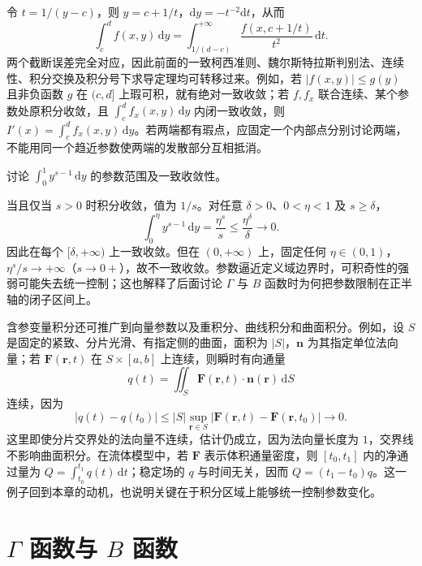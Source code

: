令 $t=1/(y-c)$，则 $y=c+1/t$，$\mathrm{d}y=-t^{-2}\mathrm{d}t$，从而
\begin{equation}
    \int_c^d f(x,y)\,\mathrm{d}y
    =\int_{1/(d-c)}^{+\infty}
        \frac{f(x,c+1/t)}{t^2}\,\mathrm{d}t.
    \label{eq:parameter-singular-to-infinite}
\end{equation}
两个截断误差完全对应，因此前面的一致柯西准则、魏尔斯特拉斯判别法、连续性、积分交换及积分号下求导定理均可转移过来。例如，若 $|f(x,y)|\leq g(y)$ 且非负函数 $g$ 在 $(c,d]$ 上瑕可积，就有绝对一致收敛；若 $f,f_x$ 联合连续、某个参数处原积分收敛，且 $\int_c^d f_x(x,y)\,\mathrm{d}y$ 内闭一致收敛，则 $I'(x)=\int_c^d f_x(x,y)\,\mathrm{d}y$。若两端都有瑕点，应固定一个内部点分别讨论两端，不能用同一个趋近参数使两端的发散部分互相抵消。

\begin{example}
\label{ex:parameter-power-singularity-uniformity}
讨论 $\displaystyle\int_0^1y^{s-1}\,\mathrm{d}y$ 的参数范围及一致收敛性。
\end{example}

\begin{solve}
当且仅当 $s>0$ 时积分收敛，值为 $1/s$。对任意 $\delta>0$、$0<\eta<1$ 及 $s\geq\delta$，
\[
    \int_0^\eta y^{s-1}\,\mathrm{d}y
    =\frac{\eta^s}{s}\leq\frac{\eta^\delta}{\delta}\longrightarrow0.
\]
因此在每个 $[\delta,+\infty)$ 上一致收敛。但在 $(0,+\infty)$ 上，固定任何 $\eta\in(0,1)$，$\eta^s/s\to+\infty$（$s\to0+$），故不一致收敛。参数逼近定义域边界时，可积奇性的强弱可能失去统一控制；这也解释了后面讨论 $\Gamma$ 与 $B$ 函数时为何把参数限制在正半轴的闭子区间上。
\end{solve}

含参变量积分还可推广到向量参数以及重积分、曲线积分和曲面积分。例如，设 $S$ 是固定的紧致、分片光滑、有指定侧的曲面，面积为 $|S|$，$\boldsymbol n$ 为其指定单位法向量；若 $\boldsymbol F(\boldsymbol r,t)$ 在 $S\times[a,b]$ 上连续，则瞬时有向通量
\[
    q(t)=\iint_S\boldsymbol F(\boldsymbol r,t)\cdot\boldsymbol n(\boldsymbol r)\,\mathrm{d}S
\]
连续，因为
\[
    |q(t)-q(t_0)|\leq |S|\sup_{\boldsymbol r\in S}
       |\boldsymbol F(\boldsymbol r,t)-\boldsymbol F(\boldsymbol r,t_0)|\longrightarrow0.
\]
这里即使分片交界处的法向量不连续，估计仍成立，因为法向量长度为 $1$，交界线不影响曲面积分。在流体模型中，若 $\boldsymbol F$ 表示体积通量密度，则 $[t_0,t_1]$ 内的净通过量为 $Q=\int_{t_0}^{t_1}q(t)\,\mathrm{d}t$；稳定场的 $q$ 与时间无关，因而 $Q=(t_1-t_0)q$。这一例子回到本章的动机，也说明关键在于积分区域上能够统一控制参数变化。

\section{\texorpdfstring{$\Gamma$}{Gamma} 函数与 \texorpdfstring{$B$}{B} 函数}
\label{sec:gamma-and-beta-functions}

